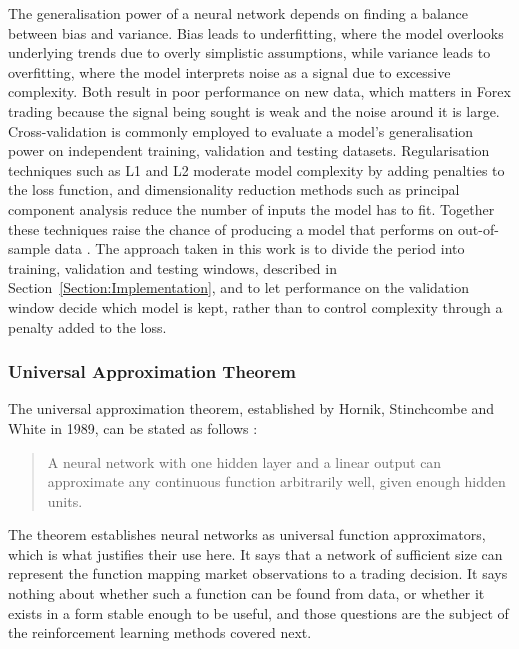 The generalisation power of a neural network depends on finding a balance between bias and variance. Bias leads to underfitting, where the model overlooks underlying trends due to overly simplistic assumptions, while variance leads to overfitting, where the model interprets noise as a signal due to excessive complexity. Both result in poor performance on new data, which matters in Forex trading because the signal being sought is weak and the noise around it is large. Cross-validation is commonly employed to evaluate a model's generalisation power on independent training, validation and testing datasets. Regularisation techniques such as L1 and L2 moderate model complexity by adding penalties to the loss function, and dimensionality reduction methods such as principal component analysis reduce the number of inputs the model has to fit. Together these techniques raise the chance of producing a model that performs on out-of-sample data \cite{goodfellow_deep_2016}. The approach taken in this work is to divide the period into training, validation and testing windows, described in Section~\ref{Section:Implementation}, and to let performance on the validation window decide which model is kept, rather than to control complexity through a penalty added to the loss.

\subsubsection{Universal Approximation Theorem}

The universal approximation theorem, established by Hornik, Stinchcombe and White in 1989, can be stated as follows \cite{hornik_multilayer_1989}:

\begin{quote}
A neural network with one hidden layer and a linear output can approximate any continuous function arbitrarily well, given enough hidden units.
\end{quote}

The theorem establishes neural networks as universal function approximators, which is what justifies their use here. It says that a network of sufficient size can represent the function mapping market observations to a trading decision. It says nothing about whether such a function can be found from data, or whether it exists in a form stable enough to be useful, and those questions are the subject of the reinforcement learning methods covered next.